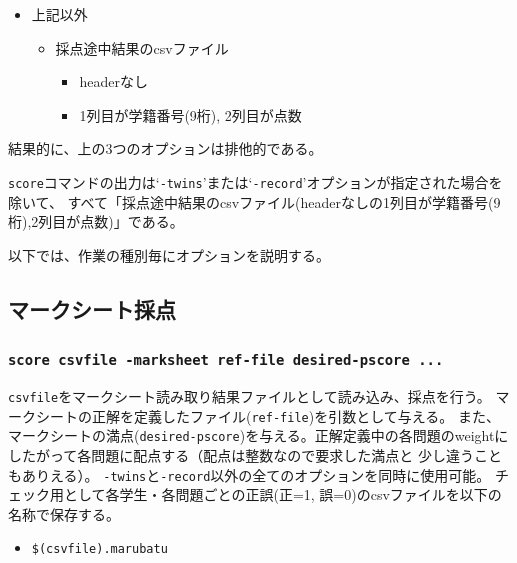 \begin{itemize}
\begin{itemize}
\begin{itemize}
\end{itemize}

\end{itemize}

\item 上記以外

\begin{itemize}
\item 採点途中結果のcsvファイル

\begin{itemize}
\item headerなし

\item 1列目が学籍番号(9桁), 2列目が点数

\end{itemize}

\end{itemize}

\end{itemize}
結果的に、上の3つのオプションは排他的である。

\texttt{score}コマンドの出力は`\texttt{-twins}'または`\texttt{-record}'オプションが指定された場合を除いて、
すべて「採点途中結果のcsvファイル(headerなしの1列目が学籍番号(9桁),2列目が点数)」である。

以下では、作業の種別毎にオプションを説明する。

\subsection{マークシート採点}
\label{マークシート採点}

\subsubsection{\texttt{score csvfile -marksheet ref-file desired-pscore ...}}
\label{scorecsvfile-marksheetref-filedesired-pscore...}

\texttt{csvfile}をマークシート読み取り結果ファイルとして読み込み、採点を行う。
マークシートの正解を定義したファイル(\texttt{ref-file})を引数として与える。
また、マークシートの満点(\texttt{desired-pscore})を与える。正解定義中の各問題のweightに
したがって各問題に配点する（配点は整数なので要求した満点と
少し違うこともありえる）。
\texttt{-twins}と\texttt{-record}以外の全てのオプションを同時に使用可能。
チェック用として各学生・各問題ごとの正誤(正=1, 誤=0)のcsvファイルを以下の
名称で保存する。

\begin{itemize}
\item \texttt{\$(csvfile).marubatu}

\end{itemize}

